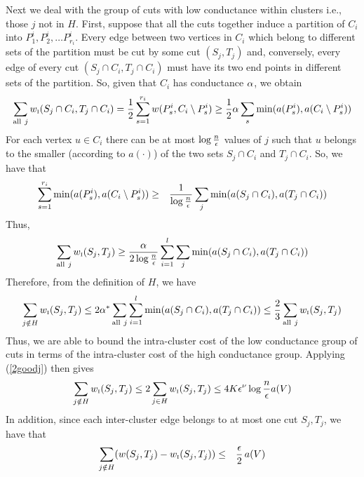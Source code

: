 \documentclass{book}
\numberwithin{exercise}{chapter}
\begin{document}
Next we deal with the group of cuts with low conductance within clusters i.e.,
those $j$ not in $H$. First, suppose that all the cuts together
induce a partition of $C_i$ into $P^i_1,P^i_2,\ldots P^i_{r_i}$.
Every edge between two vertices in $C_i$ which belong
to different sets of the partition must be cut by some cut $(S_j,T_j)$
and, conversely, every edge of every cut $(S_j\cap C_i,T_j\cap C_i)$ must have
its two end points in different sets of the partition. So, given that
$C_i$ has conductance $\alpha$, we obtain
\begin{eqnarray*}
\sum_{\mathrm{all}\ j}w_{\mbox{\tiny I}}(S_j\cap C_i,T_j\cap C_i)
	= \frac{1}{2}\sum_{s=1}^{r_i}w (P^i_s,C_i\setminus P^i_s) \geq  \frac{1}{2}\alpha \sum_{s} \min (a(P^i_s), a(C_i\setminus P^i_s))
\end{eqnarray*}
For each vertex $u\in C_i$
there can be at most $\log \frac{n}{\epsilon}$
values of $j$ such that $u$ belongs to the smaller (according to $a(\cdot )$)
of the two sets $S_j\cap C_i$ and $T_j\cap C_i$. So, we have that
\begin{eqnarray*}
\sum_{s=1}^{r_i}\min(a(P^i_s),a(C_i\setminus P^i_s))
& \geq & \frac{1}{\log \frac{n}{\epsilon}} \sum_j \min (a(S_j\cap C_i), a(T_j\cap C_i))
\end{eqnarray*}
Thus,
\begin{eqnarray*}
\sum_{\mathrm{all}\  j} w_{\mbox{\tiny I}}(S_j,T_j) \geq \frac{\alpha}{2\log \frac{n}{\epsilon}}
\sum_{i=1}^l \sum_j \min (a(S_j\cap C_i),a(T_j\cap C_i))
\end{eqnarray*}
Therefore, from the definition of $H$, we have
\begin{eqnarray*}
\sum_{j\notin H}w_{\mbox{\tiny I}}(S_j,T_j)\leq  2\alpha^* \sum_{\mathrm{all}\ j}
          \sum_{i=1}^l \min (a(S_j\cap C_i),a(T_j\cap C_i)) \leq  \frac{2}{3} \sum_{\mathrm{all}\  j} w_{\mbox{\tiny I}}(S_j,T_j)
\end{eqnarray*}
Thus, we are able to bound the intra-cluster cost of the low conductance group of cuts in terms
of the intra-cluster cost of the high conductance group. Applying (\ref{2goodj}) then gives
\begin{eqnarray}
\sum_{j\notin H}w_{\mbox{\tiny I}}(S_j,T_j) \leq  2\sum_{j\in H} w_{\mbox{\tiny I}}(S_j,T_j)
\leq 4K \epsilon^\nu \log \frac{n}{\epsilon}a(V) \label{2badj}
\end{eqnarray}
In addition, since each inter-cluster edge belongs to at most one cut $S_j,T_j$, we have that
\begin{eqnarray}
\sum_{j\notin H} (w(S_j,T_j)-w_{\mbox{\tiny I}}(S_j,T_j)) & \leq & \frac{\epsilon}{2}\, a(V) \label{2badjic}
\end{eqnarray}
\end{document}
